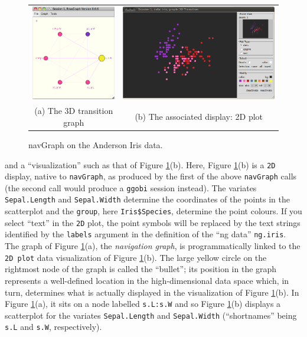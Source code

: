 \documentclass[12pt,oneside,titlepage,letter]{article}
\begin{document}
\begin{figure}[h]   
  \centering
  \begin{tabular}{cc}
  \includegraphics[width = 2.0in]{img/Iris3Dgraph.png} &
  \includegraphics[width = 4in]{img/Iris2D.png} \\
  {\small (a) The 3D transition graph}&
  {\small (b) The associated display: 2D plot}\\
  \end{tabular}
  \caption{navGraph on the Anderson Iris data.}
\label{fig:session1}
\end{figure}
and a ``visualization'' such as that of Figure  \ref{fig:session1}(b).
Here, Figure  \ref{fig:session1}(b) is a \texttt{2D} display, native to \texttt{navGraph}, as produced by the first of the above \texttt{navGraph} calls (the second call would produce a \texttt{ggobi} session instead).   
The variates \texttt{Sepal.Length} and \texttt{Sepal.Width} determine the coordinates of the points in the scatterplot and the \texttt{group}, here  \texttt{Iris\$Species}, determine the point colours.  
If you select ``text'' in the  \texttt{2D} plot, the point symbols will be replaced by the text strings
identified by the \texttt{labels} argument in the definition of the ``ng data'' \texttt{ng.iris}.\\

The graph of Figure \ref{fig:session1}(a), the {\em navigation graph}, is programmatically linked to the \texttt{2D plot} data visualization of Figure \ref{fig:session1}(b).
The large yellow circle on the rightmost node of the graph is called the ``bullet''; its position in the graph represents a well-defined location in the high-dimensional data space which, in turn, determines what is actually displayed in the visualization of Figure \ref{fig:session1}(b).  In Figure \ref{fig:session1}(a), it sits on a node labelled \texttt{s.L:s.W} and so Figure \ref{fig:session1}(b) displays a scatterplot for the variates  \texttt{Sepal.Length} and \texttt{Sepal.Width} (``shortnames'' being \texttt{s.L} and \texttt{s.W}, respectively).\\
\end{document}
